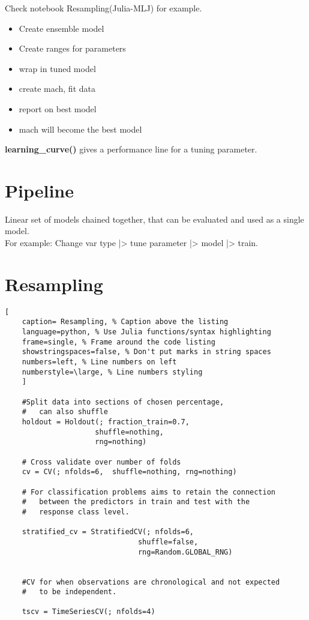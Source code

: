 \documentclass[11pt]{scrartcl} %
\begin{document}
Check notebook Resampling(Julia-MLJ) for example.

\begin{itemize}
	\item Create ensemble model
	\item Create ranges for parameters
	\item wrap in tuned model
	\item create mach, fit data
	\item report on best model
	\item mach will become the best model
\end{itemize}

\textbf{learning\_curve()} gives a performance line for a tuning parameter. 

\section{Pipeline}

Linear set of models chained together, that can be evaluated and used as a single model.\\

For example: Change var type |> tune parameter |> model |> train.

\section{Resampling}

\begin{lstlisting}[
	caption= Resampling, % Caption above the listing
	language=python, % Use Julia functions/syntax highlighting
	frame=single, % Frame around the code listing
	showstringspaces=false, % Don't put marks in string spaces
	numbers=left, % Line numbers on left
	numberstyle=\large, % Line numbers styling
	]

	#Split data into sections of chosen percentage, 
	#	can also shuffle
	holdout = Holdout(; fraction_train=0.7,
                     shuffle=nothing,
                     rng=nothing)

	# Cross validate over number of folds
	cv = CV(; nfolds=6,  shuffle=nothing, rng=nothing)

	# For classification problems aims to retain the connection
	#	between the predictors in train and test with the 
	#	response class level.

	stratified_cv = StratifiedCV(; nfolds=6,
                               shuffle=false,
                               rng=Random.GLOBAL_RNG)


	#CV for when observations are chronological and not expected 
	#	to be independent.

	tscv = TimeSeriesCV(; nfolds=4)


\end{lstlisting}
\end{document}
